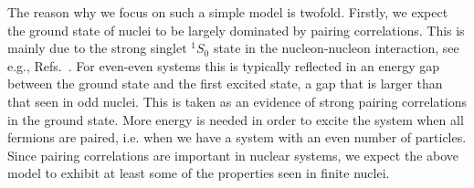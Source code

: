 The reason why we focus on such a simple model is twofold. Firstly, we expect the ground state of nuclei to be largely dominated by pairing correlations. This is mainly due to the strong singlet $^1S_0$ state in the nucleon-nucleon interaction, see e.g., Refs.\ \cite{pair1,pair2,pair3}. For even-even systems this is typically reflected in an energy gap between the ground state and the first excited state, a gap that is larger than that seen in odd nuclei. This is taken as an evidence of strong pairing correlations in the ground state. More energy is needed in order to excite the system when all fermions are paired, i.e. when we have a system with an even number of particles. Since pairing correlations are important in nuclear systems, we expect the above model to exhibit at least some of the properties seen in finite nuclei.

